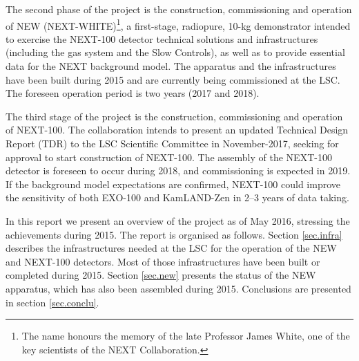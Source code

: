 The second phase of the project is the construction, commissioning and operation of NEW (NEXT-WHITE)\footnote{The name honours the memory of the late Professor James White, one of the key scientists of the NEXT Collaboration.}, a first-stage, radiopure, 10-kg demonstrator intended to exercise the NEXT-100 detector technical solutions and infrastructures (including the gas system and the Slow Controls), as well as to provide essential data for the NEXT background model. The apparatus and the infrastructures have been built during 2015 and are currently being commissioned at the LSC. The foreseen operation period is two years (2017 and 2018). 

The third stage of the project is the construction, commissioning and operation of NEXT-100. The collaboration intends to present an updated Technical Design Report (TDR) to the LSC Scientific Committee in November-2017, seeking for approval to start construction of NEXT-100. The assembly of the NEXT-100 detector is foreseen to occur during 2018, and commissioning is expected in 2019. If the background model expectations are confirmed, NEXT-100 could improve the sensitivity of both EXO-100 and KamLAND-Zen in 2--3 years of data taking\cite{Martin-Albo:2015rhw}. 

In this report we present an overview of the  project as of May 2016, stressing the achievements during 2015. The report is organised as follows. Section \ref{sec.infra} describes the infrastructures needed at the LSC for the operation of the NEW and NEXT-100 detectors.  Most of those infrastructures have been built or completed during 2015. Section \ref{sec.new} presents the status of the NEW apparatus, which has also been assembled during 2015. Conclusions are presented in section \ref{sec.conclu}.




